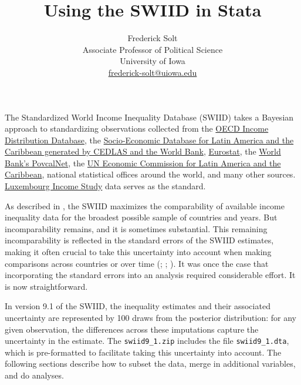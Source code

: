 \documentclass[11pt]{article}
\begin{document}
\title{Using the SWIID in Stata}
\author{
Frederick Solt\\
  Associate Professor of Political Science\\
  University of Iowa\\
  \href{mailto:frederick-solt@uiowa.edu}{frederick-solt@uiowa.edu}}
\date{}
\maketitle 

The Standardized World Income Inequality Database (SWIID) takes a Bayesian approach to standardizing observations collected from the \href{http://www.oecd.org/social/inequality.htm}{OECD Income Distribution Database}, the \href{http://sedlac.econo.unlp.edu.ar/eng/}{Socio-Economic Database for Latin America and the Caribbean generated by CEDLAS and the World Bank}, \href{http://epp.eurostat.ec.europa.eu}{Eurostat}, the \href{http://iresearch.worldbank.org/PovcalNet/index.htm}{World Bank's PovcalNet}, the \href{http://interwp.cepal.org/sisgen/ConsultaIntegrada.asp?idIndicador=250\&idioma=e}{UN Economic Commission for Latin America and the Caribbean}, national statistical offices around the world, and many other sources.  \href{http://www.lisdatacenter.org}{Luxembourg Income Study} data serves as the standard.  

As described in \citet{Solt2020}, the SWIID maximizes the comparability of available income inequality data for the broadest possible sample of countries and years.  But incomparability remains, and it is sometimes substantial.  This remaining incomparability is reflected in the standard errors of the SWIID estimates, making it often crucial to take this uncertainty into account when making comparisons across countries or over time (\citealt[238]{Solt2009}; \citealt[14]{Solt2016_nv}; \citealt{Solt2020}).  It was once the case that incorporating the standard errors into an analysis required considerable effort.  It is now straightforward.

In version 9.1 of the SWIID, the inequality estimates and their associated uncertainty are represented by 100 draws from the posterior
distribution: for any given observation, the differences across these imputations capture the uncertainty in the estimate.  The \verb+swiid9_1.zip+ includes the file \verb+swiid9_1.dta+, which is pre-formatted to facilitate taking this uncertainty into account.  The following sections describe how to subset the data, merge in additional variables, and do analyses.
\end{document}
